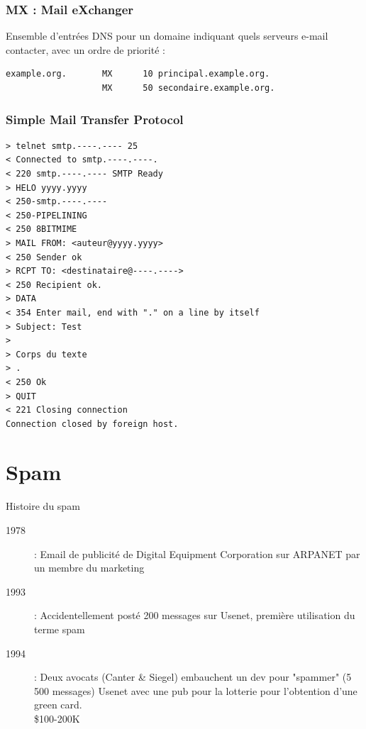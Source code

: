 \documentclass{beamer}
\begin{document}
\begin{frame}[fragile]
    \frametitle{MX : Mail eXchanger}
    Ensemble d'entrées DNS pour un domaine indiquant quels serveurs e-mail contacter, avec un ordre de priorité :
    \begin{verbatim}
example.org.       MX      10 principal.example.org.
                   MX      50 secondaire.example.org.
    \end{verbatim}
\end{frame}

\begin{frame}[fragile]
    \frametitle{Simple Mail Transfer Protocol}

    \begin{verbatim}
> telnet smtp.----.---- 25
< Connected to smtp.----.----.
< 220 smtp.----.---- SMTP Ready
> HELO yyyy.yyyy
< 250-smtp.----.----
< 250-PIPELINING
< 250 8BITMIME
> MAIL FROM: <auteur@yyyy.yyyy>
< 250 Sender ok
> RCPT TO: <destinataire@----.---->
< 250 Recipient ok.
> DATA
< 354 Enter mail, end with "." on a line by itself
> Subject: Test
>
> Corps du texte
> .
< 250 Ok
> QUIT
< 221 Closing connection
Connection closed by foreign host.
    \end{verbatim}
\end{frame}

\section{Spam}

\begin{frame}{Histoire du spam}
    \begin{description}
        \item[1978] : Email de publicité de Digital Equipment Corporation sur ARPANET par un membre du marketing
        \item[1993] : Accidentellement posté 200 messages sur Usenet, première utilisation du terme spam
        \item[1994] : Deux avocats (Canter \& Siegel) embauchent un dev pour "spammer" (5 500 messages) Usenet avec une pub pour la lotterie pour l'obtention d'une green card. \\
            \Rightarrow \$100-200K
    \end{description}
\end{frame}
\end{document}
